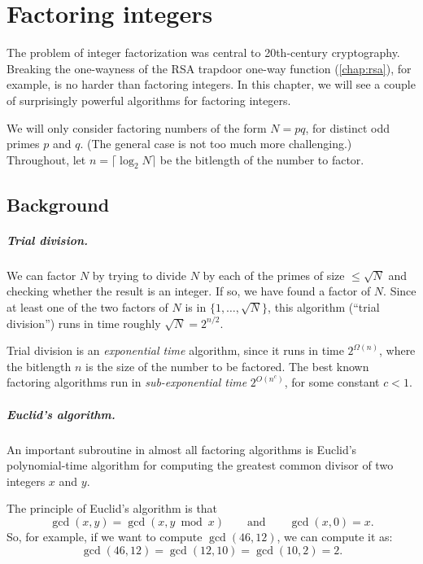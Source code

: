 \chapter{Factoring integers}
\label{sec:fact:bg}

The problem of integer factorization was central to 20th-century cryptography.
Breaking the one-wayness of the RSA trapdoor one-way function (\cref{chap:rsa}), for example,
is no harder than factoring integers.
In this chapter, we will see a couple of surprisingly powerful algorithms for factoring integers.

We will only consider factoring numbers of the form $N=pq$, for distinct odd primes $p$ and $q$.
(The general case is not too much more challenging.)
Throughout, let $n = \lceil \log_2 N \rceil$ be the bitlength of the number to factor.

\section{Background}

\paragraph{Trial division.}
We can factor $N$ by trying to divide $N$ by each of the primes of size $\leq \sqrt N$
and checking whether the result is an integer.
If so, we have found a factor of $N$.
Since at least one of the two factors of $N$ is in $\{1, \dots, \sqrt N\}$, this
algorithm (``trial division'') runs in time roughly $\sqrt{N} = 2^{n/2}$.

Trial division is an \emph{exponential time} algorithm, since it runs in time $2^{\Omega(n)}$,
where the bitlength $n$ is the size of the number to be factored.
The best known factoring algorithms run in \emph{sub-exponential time} $2^{O(n^c)}$,
for some constant $c < 1$.


\paragraph{Euclid's algorithm.}
An important subroutine in almost all factoring algorithms is Euclid's polynomial-time algorithm
for computing the greatest common divisor of two integers $x$ and $y$.

The principle of Euclid's algorithm is that
\[ \gcd(x, y) = \gcd(x, y \bmod x) \qquad \text{and} \qquad \gcd(x, 0) = x.\]
So, for example, if we want to compute $\gcd(46, 12)$, we can compute it as:
\[ \gcd(46,12) = \gcd(12, 10) = \gcd(10, 2) = 2. \]


